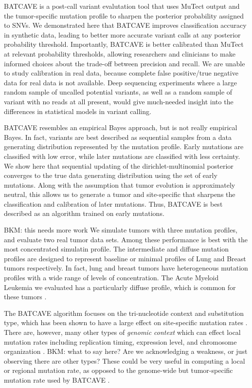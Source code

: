 \documentclass[a4,center,fleqn]{NAR}
\newcommand{\bkmcomment}[1]{{\color{blue}BKM: #1}}
\newcommand{\batcave}{BATCAVE }
\begin{document}
\batcave is a post-call variant evalutation tool that uses MuTect output and the tumor-specific mutation profile to sharpen the posterior probability assigned to SNVs.
We demonstrated here that \batcave improves classification accuracy in synthetic data, leading to better more accurate variant calls at any posterior probability threshold.
Importantly, \batcave is better calibrated than MuTect at relevant probability thresholds, allowing researchers and clinicians to make informed choices about the trade-off between precision and recall.
We are unable to study calibration in real data, because complete false positive/true negative data for real data is not available. 
Deep sequencing experiments where a large random sample of uncalled potential variants, as well as a random sample of variant with no reads at all present, would give much-needed insight into the differences in statistical models in variant calling.

\batcave resembles an empirical Bayes approach, but is not really empirical Bayes.
In fact, variants are best described as sequential samples from a data generating distribution represented by the mutation profile.
Early mutations are classified with low error, while later mutations are classified with less certainty.
We show here that sequential updating of the dirichlet-multinomial posterior converges to the true data generating distribution using the set of early mutations.
Along with the assumption that tumor evolution is approximately neutral, this allows us to generate a tumor and site-specific that sharpens the classification and calibration of later mutations.
Thus, \batcave is best described as an algorithm trained on early mutations.

\bkmcomment{this needs more work}
We simulate tumors with three mutation profiles, and evaluate two real tumor data sets.
Among these performance is best with the most concentrated simulatin profile.
The intermediate and diffuse mutation profiles are designed to represent baseline or minimal profiles of Lung and Breast tumors respectively.
In fact, lung and breast tumors have heterogeneous mutation profiles with a wide range of levels of concentration.
The Acute Myeloid Leukemia we evaluated has a particularly diffuse profile, which is common for these tumors \cite{Alexandrov2019}.

The \batcave algorithm focuses on the tri-nucleotide context and substitution type, which has been shown to have a large effect on site-specific mutation rates \cite{Martincorena2015,Hollstein2017}.
There are, however, many other types of \textit{genomic context} which can effect local mutation rates including replication timing, expression level, and chromosome organization \cite{Buisson2019,Schuster-Bockler2012,Pleasance2010}.
\bkmcomment{what to say here? Are we acknowledging a weakness, or just observing there are other types?}
These could be very useful in computing a local or regional mutation rate, as opposed to the genome-wide but tumor-specific mutation rate used by \batcave.
\end{document}
